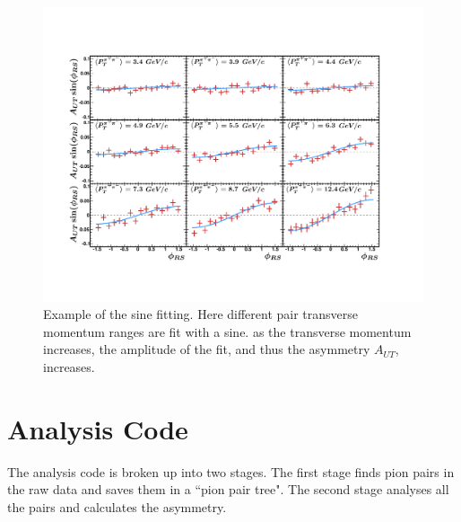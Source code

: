 \documentclass[letterpaper, abstract = on,listof=totoc, bibliography=totoc]{scrreprt}
\newcommand{\ptpair}{P_{T}^{\pi^+\pi^-}}
\newcommand{\pip}{\pi^+}
\newcommand{\pim}{\pi^-}
\newcommand{\pair}{$\pip\pim$ }
\begin{document}
\begin{figure}
\begin{center}
\includegraphics[width = 1\textwidth]{sinFit3}
\caption[Sinusoid modulation of \pair pair produciton and fit for 9 $\ptpair$ bins]{Example of the sine fitting. Here different pair transverse momentum ranges are fit with a sine. as the transverse momentum increases, the amplitude of the fit, and thus the asymmetry $A_{UT}$, increases.}
\label{fig:sinFit}
\end{center}
\end{figure}



\FloatBarrier
\section{Analysis Code}

The analysis code is broken up into two stages. The first stage finds pion pairs in the raw data and saves them in a ``pion pair tree". The second stage analyses all the pairs and calculates the asymmetry. 
\end{document}
